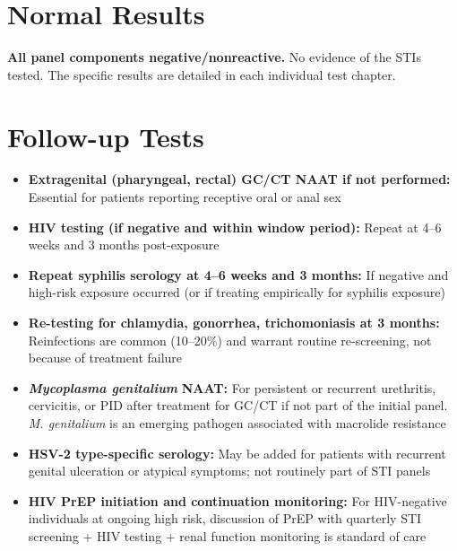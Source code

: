 \section*{Normal Results}
\textbf{All panel components negative/nonreactive.} No evidence of the STIs tested. The specific results are detailed in each individual test chapter.

\section*{Follow-up Tests}
\begin{itemize}
  \item \textbf{Extragenital (pharyngeal, rectal) GC/CT NAAT if not performed:} Essential for patients reporting receptive oral or anal sex
  \item \textbf{HIV testing (if negative and within window period):} Repeat at 4--6 weeks and 3 months post-exposure
  \item \textbf{Repeat syphilis serology at 4--6 weeks and 3 months:} If negative and high-risk exposure occurred (or if treating empirically for syphilis exposure)
  \item \textbf{Re-testing for chlamydia, gonorrhea, trichomoniasis at 3 months:} Reinfections are common (10--20\%) and warrant routine re-screening, not because of treatment failure
  \item \textit{\textbf{Mycoplasma genitalium}} \textbf{NAAT:} For persistent or recurrent urethritis, cervicitis, or PID after treatment for GC/CT if not part of the initial panel. \textit{M. genitalium} is an emerging pathogen associated with macrolide resistance
  \item \textbf{HSV-2 type-specific serology:} May be added for patients with recurrent genital ulceration or atypical symptoms; not routinely part of STI panels
  \item \textbf{HIV PrEP initiation and continuation monitoring:} For HIV-negative individuals at ongoing high risk, discussion of PrEP with quarterly STI screening + HIV testing + renal function monitoring is standard of care
\end{itemize}

